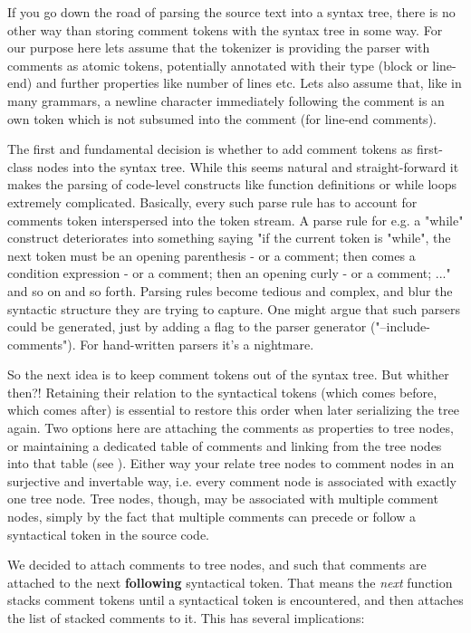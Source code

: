 \documentclass[11pt,a4paper]{article}
\begin{document}
If you go down the road of parsing the source text into a syntax tree, there is
no other way than storing comment tokens with the syntax tree in some way. For
our purpose here lets assume that the tokenizer is providing the parser with
comments as atomic tokens, potentially annotated with their type (block or
line-end) and further properties like number of lines etc. Lets also assume
that, like in many grammars, a newline character immediately following the
comment is an own token which is not subsumed into the comment (for line-end
comments).

The first and fundamental decision is whether to add comment tokens as
first-class nodes into the syntax tree. While this seems natural and
straight-forward it makes the parsing of code-level constructs like function
definitions or while loops extremely complicated. Basically, every such parse
rule has to account for comments token interspersed into the token stream. A
parse rule for e.g. a "while" construct deteriorates into something saying "if
the current token is "while", the next token must be an opening parenthesis - or
a comment; then comes a condition expression - or a comment; then an opening
curly - or a comment; ..." and so on and so forth. Parsing rules become tedious
and complex, and blur the syntactic structure they are trying to capture. One
might argue that such parsers could be generated, just by adding a flag to the
parser generator ("--include-comments"). For hand-written parsers it's a
nightmare.

So the next idea is to keep comment tokens out of the syntax tree. But whither
then?! Retaining their relation to the syntactical tokens (which comes before,
which comes after) is essential to restore this order when later serializing the
tree again. Two options here are attaching the comments as properties to tree
nodes, or maintaining a dedicated table of comments and linking from the tree
nodes into that table (see \cite{bartho-2009}). Either way your relate tree nodes to comment nodes in an
surjective and invertable way, i.e. every comment node is associated with
exactly one tree node. Tree nodes, though, may be associated with multiple
comment nodes, simply by the fact that multiple comments can precede or follow a
syntactical token in the source code.

We decided to attach comments to tree nodes, and such that comments are attached
to the next \textbf{following} syntactical token. That means the \textit{next}
function stacks comment tokens until a syntactical token is encountered,
and then attaches the list of stacked comments to it. This has several implications:
\end{document}
